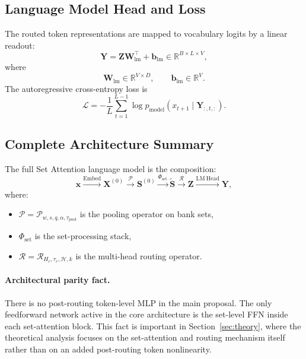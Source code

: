 \documentclass{article}
\theoremstyle{plain}
\theoremstyle{definition}
\theoremstyle{remark}
\begin{document}
\subsection{Language Model Head and Loss}
\label{sec:lm-head}

The routed token representations are mapped to vocabulary logits by a linear readout:
\begin{equation}
\label{eq:output-logits}
\mathbf Y=\mathbf Z\mathbf W_{\mathrm{lm}}^\top+\mathbf b_{\mathrm{lm}}
\in\mathbb R^{B\times L\times V},
\end{equation}
where
\begin{equation}
\mathbf W_{\mathrm{lm}}\in\mathbb R^{V\times D},
\qquad
\mathbf b_{\mathrm{lm}}\in\mathbb R^V.
\end{equation}
The autoregressive cross-entropy loss is
\begin{equation}
\label{eq:cross-entropy}
\mathcal L
=
-\frac{1}{L}\sum_{t=1}^{L-1}
\log p_{\mathrm{model}}(x_{t+1}\mid \mathbf Y_{:,t,:}).
\end{equation}

\subsection{Complete Architecture Summary}
\label{sec:architecture-summary}

The full Set Attention language model is the composition:
\begin{equation}
\label{eq:full-pipeline}
\mathbf x
\xrightarrow{\mathrm{Embed}}
\mathbf X^{(0)}
\xrightarrow{\mathcal P}
\mathbf S^{(0)}
\xrightarrow{\Phi_{\mathrm{set}}}
\widetilde{\mathbf S}
\xrightarrow{\mathcal R}
\mathbf Z
\xrightarrow{\mathrm{LM\ Head}}
\mathbf Y,
\end{equation}
where:
\begin{itemize}
    \item $\mathcal P=\mathcal P_{w,s,q,\alpha,\tau_{\mathrm{pool}}}$ is the pooling operator on bank sets,
    \item $\Phi_{\mathrm{set}}$ is the set-processing stack,
    \item $\mathcal R=\mathcal R_{H_r,\tau_r,\mathcal H,k}$ is the multi-head routing operator.
\end{itemize}

\paragraph{Architectural parity fact.}
There is no post-routing token-level MLP in the main proposal. The only feedforward network active in the core architecture is the set-level FFN inside each set-attention block. This fact is important in Section~\ref{sec:theory}, where the theoretical analysis focuses on the set-attention and routing mechanism itself rather than on an added post-routing token nonlinearity.
\end{document}
